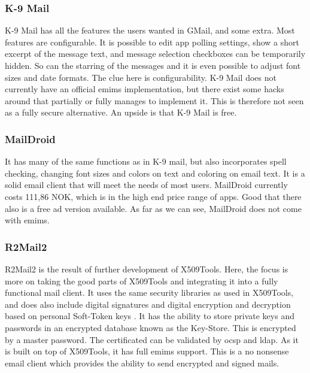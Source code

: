 \subsubsection{K-9 Mail}
K-9 Mail has all the features the users wanted in GMail, and some extra. Most features are configurable. It is possible to edit app polling settings, show a short excerpt of the message text, and message selection checkboxes can be temporarily hidden. So can the starring of the messages and it is even possible to adjust font sizes and date formats. The clue here is configurability. K-9 Mail does not currently have an official \gls{emims} implementation, but there exist some hacks around that partially or fully manages to implement it. This is therefore not seen as a fully secure alternative. An upside is that K-9 Mail is free.

\subsubsection{MailDroid}
It has many of the same functions as in K-9 mail, but also incorporates spell checking, changing font sizes and colors on text and coloring on email text. It is a solid email client that will meet the needs of most users. MailDroid currently costs 111,86 NOK, which is in the high end price range of apps. Good that there also is a free ad version available. As far as we can see, MailDroid does not come with \gls{emims}. 

\subsubsection{R2Mail2}
R2Mail2 is the result of further development of X509Tools. Here, the focus is more on taking the good parts of X509Tools and integrating it into a fully functional mail client. It uses the same security libraries as used in X509Tools, and does also include digital signatures and digital encryption and decryption based on personal Soft-Token keys \cite{bib:r2mail2}. It has the ability to store private keys and passwords in an encrypted database known as the Key-Store. This is encrypted by a master password. The certificated can be validated by \gls{ocsp} and \gls{ldap}. As it is built on top of X509Tools, it has full \gls{emims} support. This is a no nonsense email client which provides the ability to send encrypted and signed mails.

